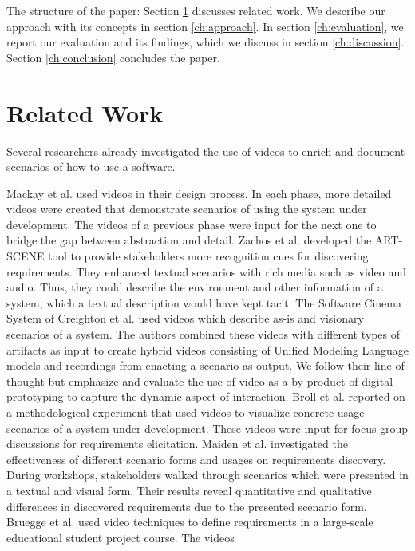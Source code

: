 \documentclass[conference]{IEEEtran}
\begin{document}
The structure of the paper: Section \ref{ch:related_work} discusses 
related work. We describe our approach with its concepts in section 
\ref{ch:approach}. In section \ref{ch:evaluation}, we report our evaluation 
and its findings, which we discuss in section \ref{ch:discussion}. 
Section \ref{ch:conclusion} concludes the paper.

\section{Related Work}
\label{ch:related_work}
Several researchers already investigated the use of videos to enrich and 
document scenarios of how to use a software.

Mackay et al. \cite{Mackay.2000} used videos in their design process. In each 
phase, more detailed videos were created that demonstrate scenarios 
of using the system under development. The videos of a previous phase 
were input for the next one to bridge the gap between abstraction and detail. 
Zachos et al. \cite{Zachos.2005} developed the ART-SCENE tool to provide 
stakeholders more recognition cues for discovering requirements. They enhanced 
textual scenarios with rich media such as video and audio. Thus, they could 
describe the environment and other information of a system, which a textual 
description would have kept tacit.
The Software Cinema System of Creighton et al. \cite{Creighton.2006, 
Creighton.2006b} used videos which describe as-is and visionary scenarios of a 
system. The authors combined these videos with different types of artifacts as 
input to create hybrid videos consisting of Unified Modeling Language models 
and recordings from enacting a scenario as output. We follow their line of 
thought but emphasize and evaluate the use of video as a by-product of
digital prototyping to capture the dynamic aspect of interaction.
Broll et al. \cite{Broll.2007} reported on a methodological experiment that 
used videos to visualize concrete usage scenarios of a system under 
development. These videos were input for focus group discussions for 
requirements elicitation.
Maiden et al. \cite{Maiden.2007} investigated the effectiveness of different 
scenario forms and usages on requirements discovery. During workshops, 
stakeholders walked through scenarios which were presented in a textual and 
visual form. Their results reveal quantitative and qualitative differences in 
discovered requirements due to the presented scenario form.
Bruegge et al. \cite{Bruegge.2008} used video techniques to define 
requirements in a large-scale educational student project course. The videos 
\end{document}
